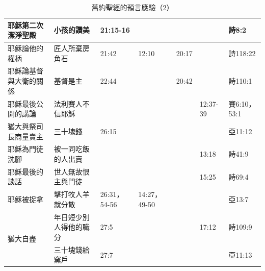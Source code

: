 \begin{table}[htbp]
\begin{tabular}{|p{11.72em}|p{7.11em}|p{4.445em}|p{5.39em}|l|l|p{4.39em}|}
耶穌第二次潔淨聖殿    & 小孩的讚美 &  21:15-16 &   &   &       & 詩8:2 \\
    \midrule
    耶穌論他的權柄 & 匠人所棄房角石 & 21:42 & 12:10 & 20:17 &       & 詩118:22 \\
    \midrule
    耶穌論基督與大衛的關係 & 基督是主  & 22:44 & \multicolumn{1}{r|}{} & 20:42 &       & 詩110:1 \\
        \midrule  
     耶穌最後公開的講論 & 法利賽人不信耶穌 &  & \multicolumn{1}{r|}{} & \multicolumn{1}{r|}{} & \multicolumn{1}{p{4.055em}|}{12:37-39} & 賽6:10，53:1 \\
    \midrule
    猶大與祭司長商量賣主 & 三十塊錢  & 26:15 & \multicolumn{1}{r|}{} & \multicolumn{1}{r|}{} &       & 亞11:12 \\
    \midrule
    耶穌為門徒洗腳 & 被一同吃飯的人出賣 &       & \multicolumn{1}{r|}{} & \multicolumn{1}{r|}{} & \multicolumn{1}{p{4.055em}|}{13:18} & 詩41:9 \\
    \midrule
    耶穌最後的談話 & 世人無故恨主與門徒 &  & \multicolumn{1}{r|}{} & \multicolumn{1}{r|}{} & \multicolumn{1}{p{4.055em}|}{15:25} & 詩69:4 \\
    \midrule
    耶穌被捉拿 & 擊打牧人羊就分散 & 26:31，54-56 & 14:27，49-50 & \multicolumn{1}{r|}{} &       & 亞13:7 \\
    \midrule
    \multirow{2}[4]{*}{猶大自盡} & 年日短少別人得他的職分 & 27:5 & \multicolumn{1}{r|}{} & \multicolumn{1}{r|}{} & \multicolumn{1}{p{4.055em}|}{17:12} & 詩109:9 \\
\cmidrule{2-7}    \multicolumn{1}{|r|}{} & 三十塊錢給窯戶 & 27:7 & \multicolumn{1}{r|}{} & \multicolumn{1}{r|}{} &       & 亞11:13 \\
    \bottomrule
    \end{tabular}%
      \caption{舊約聖經的預言應驗（2）}
  \label{tab:addlabel}%
\end{table}%

 
 
